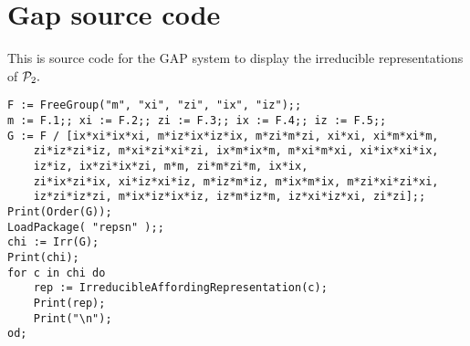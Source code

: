 \documentclass[12pt,notitlepage,longbibliography,nofootinbib,tightenlines]{revtex4}
\begin{document}

\appendix

\section{Gap source code}

This is source code for the GAP system \cite{GAP4} to display
the irreducible representations of $\mathcal{P}_2.$

\begin{verbatim}
F := FreeGroup("m", "xi", "zi", "ix", "iz");;
m := F.1;; xi := F.2;; zi := F.3;; ix := F.4;; iz := F.5;;
G := F / [ix*xi*ix*xi, m*iz*ix*iz*ix, m*zi*m*zi, xi*xi, xi*m*xi*m, 
    zi*iz*zi*iz, m*xi*zi*xi*zi, ix*m*ix*m, m*xi*m*xi, xi*ix*xi*ix, 
    iz*iz, ix*zi*ix*zi, m*m, zi*m*zi*m, ix*ix, 
    zi*ix*zi*ix, xi*iz*xi*iz, m*iz*m*iz, m*ix*m*ix, m*zi*xi*zi*xi, 
    iz*zi*iz*zi, m*ix*iz*ix*iz, iz*m*iz*m, iz*xi*iz*xi, zi*zi];;
Print(Order(G));
LoadPackage( "repsn" );;
chi := Irr(G);
Print(chi);
for c in chi do
    rep := IrreducibleAffordingRepresentation(c);
    Print(rep);
    Print("\n");
od;
\end{verbatim}


{}

\end{document}
